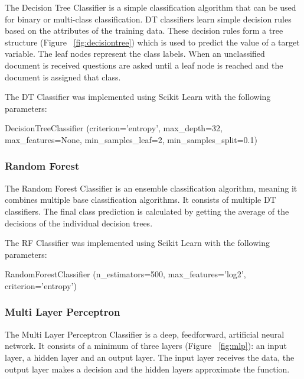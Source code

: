 The Decision Tree Classifier is a simple classification algorithm that can be used for binary or multi-class classification. DT classifiers learn simple decision rules based on the attributes of the training data. These decision rules form a tree structure (Figure ~\ref{fig:decisiontree}) which is used to predict the value of a target variable. The leaf nodes represent the class labels. When an unclassified document is received questions are asked until a leaf node is reached and the document is assigned that class.\newline\newline

The DT Classifier was implemented using Scikit Learn with the following parameters:

\begin{tcolorbox}
\begin{center}
	DecisionTreeClassifier (criterion='entropy', max\_depth=32, max\_features=None, min\_samples\_leaf=2, min\_samples\_split=0.1)
\end{center}
\end{tcolorbox}

\subsubsection*{Random Forest}

The Random Forest Classifier is an ensemble classification algorithm, meaning it combines multiple base classification algorithms. It consists of multiple DT classifiers. The final class prediction is calculated by getting the average of the decisions of the individual decision trees.

The RF Classifier was implemented using Scikit Learn with the following parameters:

\begin{tcolorbox}
\begin{center}
	RandomForestClassifier (n\_estimators=500, max\_features='log2', criterion='entropy')
\end{center}
\end{tcolorbox}

\subsubsection*{Multi Layer Perceptron}

The Multi Layer Perceptron Classifier is a deep, feedforward, artificial neural network. It consists of a minimum of three layers (Figure ~\ref{fig:mlp}): an input layer, a hidden layer and an output layer. The input layer receives the data, the output layer makes a decision and the hidden layers approximate the function.

